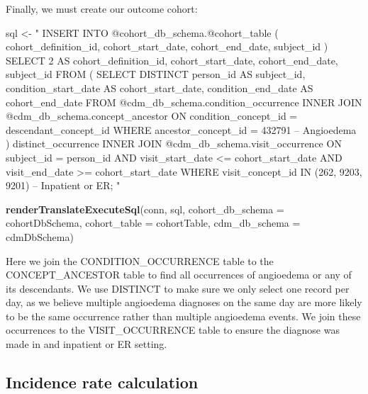 \documentclass[11pt]{book}
\newenvironment{Shaded}{\begin{snugshade}}{\end{snugshade}}
\newcommand{\KeywordTok}[1]{\textcolor[rgb]{0.13,0.29,0.53}{\textbf{#1}}}
\newcommand{\DataTypeTok}[1]{\textcolor[rgb]{0.13,0.29,0.53}{#1}}
\newcommand{\StringTok}[1]{\textcolor[rgb]{0.31,0.60,0.02}{#1}}
\newcommand{\NormalTok}[1]{#1}
\begin{document}
Finally, we must create our outcome cohort:

\begin{Shaded}
\begin{Highlighting}[]
\NormalTok{sql <-}\StringTok{ "}
\StringTok{INSERT INTO @cohort_db_schema.@cohort_table (}
\StringTok{ cohort_definition_id,}
\StringTok{ cohort_start_date,}
\StringTok{ cohort_end_date,}
\StringTok{subject_id}
\StringTok{)}
\StringTok{SELECT 2 AS cohort_definition_id,}
\StringTok{  cohort_start_date,}
\StringTok{  cohort_end_date,}
\StringTok{  subject_id}
\StringTok{FROM (}
\StringTok{  SELECT DISTINCT person_id AS subject_id,}
\StringTok{    condition_start_date AS cohort_start_date,}
\StringTok{    condition_end_date AS cohort_end_date}
\StringTok{  FROM @cdm_db_schema.condition_occurrence}
\StringTok{  INNER JOIN @cdm_db_schema.concept_ancestor}
\StringTok{    ON condition_concept_id = descendant_concept_id}
\StringTok{  WHERE ancestor_concept_id = 432791 -- Angioedema}
\StringTok{) distinct_occurrence}
\StringTok{INNER JOIN @cdm_db_schema.visit_occurrence}
\StringTok{  ON subject_id = person_id}
\StringTok{  AND visit_start_date <= cohort_start_date}
\StringTok{  AND visit_end_date >= cohort_start_date}
\StringTok{WHERE visit_concept_id IN (262, 9203,}
\StringTok{    9201) -- Inpatient or ER;}
\StringTok{"}

\KeywordTok{renderTranslateExecuteSql}\NormalTok{(conn, sql,}
                          \DataTypeTok{cohort_db_schema =}\NormalTok{ cohortDbSchema,}
                          \DataTypeTok{cohort_table =}\NormalTok{ cohortTable,}
                          \DataTypeTok{cdm_db_schema =}\NormalTok{ cdmDbSchema)}
\end{Highlighting}
\end{Shaded}

Here we join the CONDITION\_OCCURRENCE table to the CONCEPT\_ANCESTOR
table to find all occurrences of angioedema or any of its descendants.
We use DISTINCT to make sure we only select one record per day, as we
believe multiple angioedema diagnoses on the same day are more likely to
be the same occurrence rather than multiple angioedema events. We join
these occurrences to the VISIT\_OCCURRENCE table to ensure the diagnose
was made in and inpatient or ER setting.

\subsection{Incidence rate
calculation}\label{incidence-rate-calculation}
\end{document}
